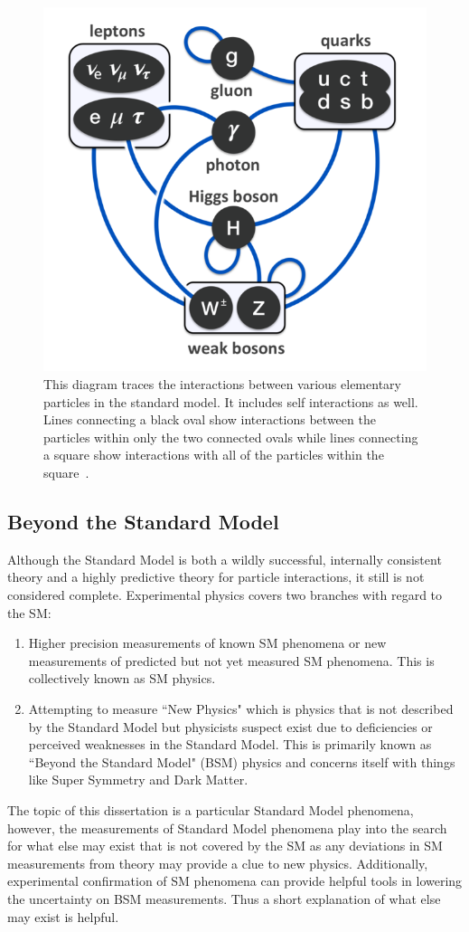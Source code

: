  \begin{figure}[h]
\begin{center}
\includegraphics[width=0.8\linewidth]{Figs/particle_interactions_in_SM.png}
\caption{\label{fig:boson_interactions}
 This diagram traces the interactions between various elementary particles in the standard model. It includes self interactions as well. Lines connecting a black oval show interactions between the particles within only the two connected ovals while lines connecting a square show interactions with all of the particles within the square~\cite{wikiinteractions}.
}
\end{center}
\end{figure}

\subsection {Beyond the Standard Model}
Although the Standard Model is both a wildly successful, internally consistent theory and a highly predictive theory for particle interactions, it still is not considered complete. Experimental physics covers two branches with regard to the SM:
\begin{enumerate}
\item Higher precision measurements of known SM phenomena or new measurements of predicted but not yet measured SM phenomena. This is collectively known as SM physics.
\item Attempting to measure ``New Physics" which is physics that is not described by the Standard Model but physicists suspect exist due to deficiencies or perceived weaknesses in the Standard Model. This is primarily known as ``Beyond the Standard Model" (BSM) physics and concerns itself with things like Super Symmetry and Dark Matter.
\end{enumerate}
The topic of this dissertation is a particular Standard Model phenomena, however, the measurements of Standard Model phenomena play into the search for what else may exist that is not covered by the SM as any deviations in SM measurements from theory may provide a clue to new physics. Additionally, experimental confirmation of SM phenomena can provide helpful tools in lowering the uncertainty on BSM measurements. Thus a short explanation of what else may exist is helpful.\\

